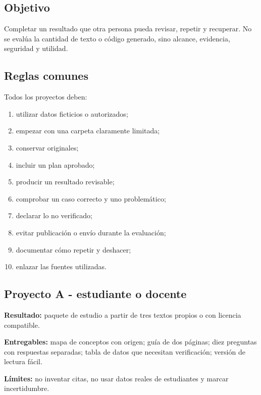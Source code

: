 \documentclass[10pt,a4paper,openany]{book}
\providecommand{\tightlist}{\setlength{\itemsep}{0.18em}\setlength{\parskip}{0pt}}
\begin{document}
\subsection{Objetivo}\label{objetivo}

Completar un resultado que otra persona pueda revisar, repetir y
recuperar. No se evalúa la cantidad de texto o código generado, sino
alcance, evidencia, seguridad y utilidad.

\subsection{Reglas comunes}\label{reglas-comunes}

Todos los proyectos deben:

\begin{enumerate}
\def\labelenumi{\arabic{enumi}.}
\tightlist
\item
  utilizar datos ficticios o autorizados;
\item
  empezar con una carpeta claramente limitada;
\item
  conservar originales;
\item
  incluir un plan aprobado;
\item
  producir un resultado revisable;
\item
  comprobar un caso correcto y uno problemático;
\item
  declarar lo no verificado;
\item
  evitar publicación o envío durante la evaluación;
\item
  documentar cómo repetir y deshacer;
\item
  enlazar las fuentes utilizadas.
\end{enumerate}

\subsection{Proyecto A - estudiante o
docente}\label{proyecto-a---estudiante-o-docente}

\textbf{Resultado:} paquete de estudio a partir de tres textos propios o
con licencia compatible.

\textbf{Entregables:} mapa de conceptos con origen; guía de dos páginas;
diez preguntas con respuestas separadas; tabla de datos que necesitan
verificación; versión de lectura fácil.

\textbf{Límites:} no inventar citas, no usar datos reales de estudiantes
y marcar incertidumbre.
\end{document}
